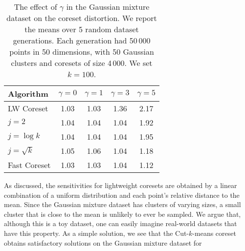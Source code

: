 \begin{table}[htbp]
    \centering
    \begin{tabular}{lcccc}
        Algorithm & $\gamma = 0$ & $\gamma = 1$ & $\gamma = 3$ & $\gamma = 5$\\
        \hline
        LW Coreset & 1.03 & 1.03 & 1.36 & 2.17\\
        $j=2$ & 1.04 & 1.04 & 1.04 & 1.92\\
        $j=\log k$ & 1.04 & 1.04 & 1.04 & 1.95\\
        $j=\sqrt{k}$ & 1.05 & 1.06 & 1.04 & 1.18\\
        Fast Coreset & 1.03 & 1.03 & 1.04 & 1.12
    \end{tabular}
    \caption{The effect of $\gamma$ in the Gaussian mixture dataset on the coreset distortion. We report the means over 5 random dataset generations.
    Each generation had 50\,000 points in 50 dimensions, with 50 Gaussian clusters and coresets of size 4\,000. We set $k=100$.}
        \label{tbl:class-imbalance}
\end{table}


As discussed, the sensitivities for lightweight coresets are obtained by a linear combination of a uniform distribution and each point's relative
distance to the mean. Since the Gaussian mixture dataset has clusters of varying sizes, a small cluster that is close to the mean is unlikely
to ever be sampled. We argue that, although this is a toy dataset, one can easily imagine real-world datasets that have this property. 
As a simple solution, we see that the Cut-$k$-means coreset obtains satisfactory solutions on the Gaussian mixture dataset for 


